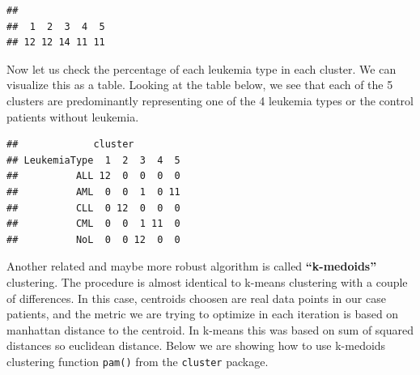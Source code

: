 \documentclass[12pt,]{krantz}
\newenvironment{Shaded}{\begin{snugshade}}{\end{snugshade}}
\newcommand{\CommentTok}[1]{\textcolor[rgb]{0.56,0.35,0.01}{\textit{#1}}}
\newcommand{\DataTypeTok}[1]{\textcolor[rgb]{0.13,0.29,0.53}{#1}}
\newcommand{\DecValTok}[1]{\textcolor[rgb]{0.00,0.00,0.81}{#1}}
\newcommand{\KeywordTok}[1]{\textcolor[rgb]{0.13,0.29,0.53}{\textbf{#1}}}
\newcommand{\NormalTok}[1]{#1}
\newcommand{\OperatorTok}[1]{\textcolor[rgb]{0.81,0.36,0.00}{\textbf{#1}}}
\newcommand{\StringTok}[1]{\textcolor[rgb]{0.31,0.60,0.02}{#1}}
\theoremstyle{definition}
\theoremstyle{definition}
\theoremstyle{definition}
\theoremstyle{remark}
\begin{document}
\begin{verbatim}
## 
##  1  2  3  4  5 
## 12 12 14 11 11
\end{verbatim}

Now let us check the percentage of each leukemia type in each cluster.
We can visualize this as a table. Looking at the table below, we see
that each of the 5 clusters are predominantly representing one of the 4
leukemia types or the control patients without leukemia.

\begin{Shaded}
\end{Shaded}

\begin{verbatim}
##             cluster
## LeukemiaType  1  2  3  4  5
##          ALL 12  0  0  0  0
##          AML  0  0  1  0 11
##          CLL  0 12  0  0  0
##          CML  0  0  1 11  0
##          NoL  0  0 12  0  0
\end{verbatim}

Another related and maybe more robust algorithm is called
\textbf{``k-medoids''} clustering. The procedure is almost identical to
k-means clustering with a couple of differences. In this case, centroids
choosen are real data points in our case patients, and the metric we are
trying to optimize in each iteration is based on manhattan distance to
the centroid. In k-means this was based on sum of squared distances so
euclidean distance. Below we are showing how to use k-medoids clustering
function \texttt{pam()} from the \texttt{cluster} package.

\begin{Shaded}
\end{Shaded}
\end{document}
